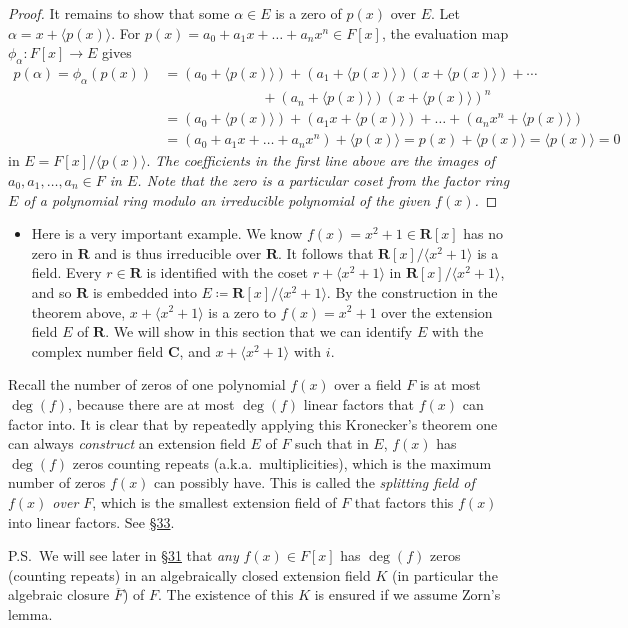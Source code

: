 \documentclass[11pt]{article}
\newcommand{\lk}[2]{\hyperlink{subsection.#1.#2}{\S#2}} %
\newcommand{\R}{\mathbf{R}}
\newcommand{\C}{\mathbf{C}}
\newcommand{\df}[1]{\textit{\textsf{#1}}}
\newcommand{\la}{\langle}
\newcommand{\ra}{\rangle}
\newcommand{\gen}[1]{\langle #1 \rangle}
\newcommand{\clos}[1]{\overline{#1}}
\begin{document}
\begin{itemize}
\begin{proof}
        It remains to show that some $\alpha \in E$ is a zero of $p(x)$ over $E$. Let $\alpha = x + \gen{p(x)}$. For $p(x) = a_0 + a_1x + \dots + a_n x^n \in F[x]$, the evaluation map $\phi_\alpha: F[x] \to E$ gives 
        \begin{align*}
            p(\alpha) = \phi_\alpha(p(x)) & = (a_0 + \gen{p(x)}) + (a_1 + \gen{p(x)})(x + \gen{p(x)}) + \cdots \\ & \qquad \qquad \qquad \quad + (a_n + \gen{p(x)})(x+\gen{p(x)})^n \\ & = (a_0 + \gen{p(x)}) + (a_1x + \gen{p(x)}) + \dots + (a_nx^n + \gen{p(x)}) \\ & = (a_0 + a_1x + \dots + a_n x^n) + \gen{p(x)} = p(x) + \gen{p(x)} = \gen{p(x)} = 0
        \end{align*}
        in $E = F[x]/\gen{p(x)}$. \emph{The coefficients in the first line above are the images of $a_0,a_1,\dots,a_n \in F$ in $E$. Note that the zero is a particular coset from the factor ring $E$ of a polynomial ring modulo an irreducible polynomial of the given $f(x)$.}
    \end{proof}
    \begin{itemize}
        \item Here is a very important example. We know $f(x) = x^2 + 1 \in \R[x]$ has no zero in $\R$ and is thus irreducible over $\R$. It follows that $\R[x]/\la x^2 + 1 \ra$ is a field. Every $r \in \R$ is identified with the coset $r + \la x^2 + 1 \ra$ in $\R[x]/\la x^2+1 \ra$, and so $\R$ is embedded into $E \coloneqq \R[x]/\la x^2+1 \ra$. By the construction in the theorem above, $x + \la x^2+1 \ra$ is a zero to $f(x) = x^2 + 1$ over the extension field $E$ of $\R$. We will show in this section that we can identify $E$ with the complex number field $\C$, and $x + \la x^2+1 \ra$ with $i$.
    \end{itemize}
\end{itemize}
    \begin{framed}
    Recall the number of zeros of one polynomial $f(x)$ over a field $F$ is at most $\deg(f)$, because there are at most $\deg(f)$ linear factors that $f(x)$ can factor into. It is clear that by repeatedly applying this Kronecker's theorem one can always \emph{construct} an extension field $E$ of $F$ such that in $E$, $f(x)$ has $\deg(f)$ zeros counting repeats (a.k.a.\ multiplicities), which is the maximum number of zeros $f(x)$ can possibly have. This is called the \df{splitting field of $f(x)$ over $F$}, which is the smallest extension field of $F$ that factors this $f(x)$ into linear factors. See \lk{6}{33}.
    
    P.S.\ We will see later in \lk{6}{31} that \emph{any} $f(x) \in F[x]$ has $\deg(f)$ zeros (counting repeats) in an algebraically closed extension field $K$ (in particular the algebraic closure $\clos{F}$) of $F$. The existence of this $K$ is ensured if we assume Zorn's lemma.
    \end{framed}
\end{document}
